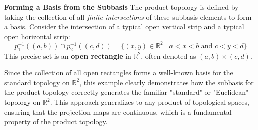\documentclass[12pt]{article} %
\begin{document}
\begin{example}
	\textbf{Forming a Basis from the Subbasis}
	The product topology is defined by taking the collection of all \textit{finite intersections} of these subbasis elements to form a basis.
	Consider the intersection of a typical open vertical strip and a typical open horizontal strip:
	$$ p_1^{-1}((a,b)) \cap p_2^{-1}((c,d)) = \{ (x,y) \in \mathbb{R}^2 \mid a < x < b \text{ and } c < y < d \} $$
	This precise set is an \textbf{open rectangle} in $\mathbb{R}^2$, often denoted as $(a,b) \times (c,d)$.
	
	Since the collection of all open rectangles forms a well-known basis for the standard topology on $\mathbb{R}^2$, this example clearly demonstrates how the subbasis for the product topology correctly generates the familiar "standard" or "Euclidean" topology on $\mathbb{R}^2$. This approach generalizes to any product of topological spaces, ensuring that the projection maps are continuous, which is a fundamental property of the product topology.
\end{example}

\newpage
{}		
	\begingroup
            \printbibliography
        \endgroup
\end{document}
